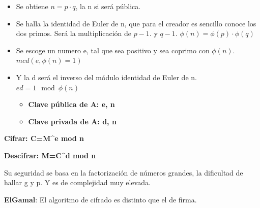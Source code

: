 \documentclass[12pt, twoside, openright]{report} %
\begin{document}
\begin{itemize}
\begin{itemize}
\begin{itemize}
      \item Se obtiene $n=p\cdot q$, la n si será pública.
        
      \item Se halla la identidad de Euler de n, que para el creador es
        sencillo conoce los dos primos. Será la multiplicación de $p-1$. y
        $q-1$. $\phi(n) = \phi(p)\cdot\phi(q)$
        
      \item Se escoge un numero e, tal que sea positivo y sea coprimo con
        $\phi (n)$. $mcd(e, \phi(n)=1)$
        
      \item Y la d será el inverso del módulo identidad de Euler de n.
        $ed = 1 \mod \phi (n)$
        

        \begin{itemize}
        \item \textbf{Clave pública de A: e, n}
          
        \item \textbf{Clave privada de A: d, n}
          
        \end{itemize}
      \end{itemize}
    \end{itemize}
  \end{itemize}

  
\textbf{Cifrar: C=M\^{}e mod n}

\textbf{Descifrar: M=C\^{}d mod n}

  
  Su seguridad se basa en la factorización de números grandes, la
  dificultad de hallar g y p. Y es de complejidad muy elevada.
  

  
  \textbf{ElGamal}: El algoritmo de cifrado es distinto que el de firma.
  
\end{document}
